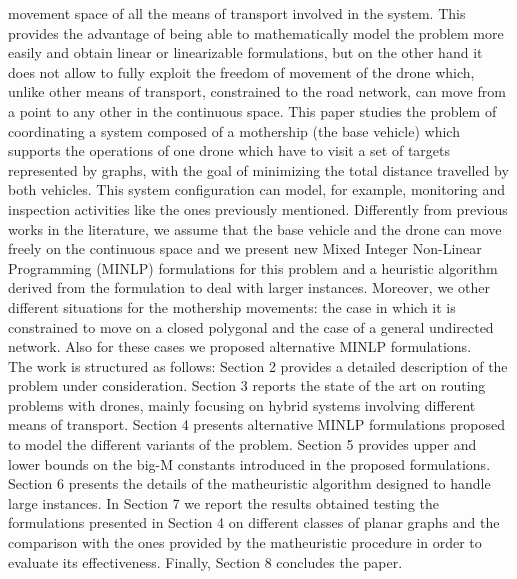 movement space of all the means of transport involved in the system. This provides the advantage of being able to mathematically model the problem more easily and obtain linear or linearizable formulations, but on the other hand it does not allow to fully exploit the freedom of movement of the drone which, unlike other means of transport, constrained to the road network, can move from a point to any other in the continuous space. This paper studies the problem of coordinating a system composed of a mothership (the base vehicle) which supports the operations of one drone which have to visit a set of targets represented by graphs, with the goal of minimizing the total distance travelled by both vehicles. This system configuration can model, for example, monitoring and inspection activities like the ones previously mentioned. Differently from previous works in the literature, we assume that the base vehicle and the drone can move freely on the continuous space and we present new Mixed Integer Non-Linear Programming (MINLP) formulations for this problem and a heuristic algorithm derived from the formulation to deal with larger instances. Moreover, we  other different situations for the mothership movements: the case in which it is constrained to move on a closed polygonal and the case of a general undirected network. Also for these cases we proposed alternative MINLP formulations.\\
The work is structured as follows: Section 2 provides a detailed description of the problem under consideration. Section 3 reports the state of the art on routing problems with drones, mainly focusing on hybrid systems involving different means of transport. Section 4 presents alternative MINLP formulations proposed to model the different variants of the problem. Section 5 provides upper and lower bounds on the big-M constants introduced in the proposed formulations. Section 6 presents the details of the matheuristic algorithm designed to handle large instances. In Section 7 we report the results obtained testing the formulations presented in Section 4 on different classes of planar graphs and the comparison with the ones provided by the matheuristic procedure in order to evaluate its effectiveness. Finally, Section 8 concludes the paper.